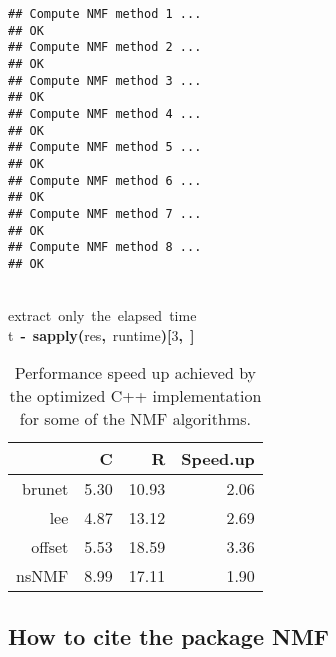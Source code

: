 \documentclass[a4paper]{article}\usepackage{graphicx, color}
\makeatletter
\newcommand{\hlnumber}[1]{\textcolor[rgb]{0,0,0}{#1}}%
\newcommand{\hlfunctioncall}[1]{\textcolor[rgb]{0.501960784313725,0,0.329411764705882}{\textbf{#1}}}%
\newcommand{\hlkeyword}[1]{\textcolor[rgb]{0,0,0}{\textbf{#1}}}%
\newcommand{\hlcomment}[1]{\textcolor[rgb]{0.180392156862745,0.6,0.341176470588235}{#1}}%
\newcommand{\hlassignement}[1]{\textcolor[rgb]{0,0,0}{\textbf{#1}}}%
\newcommand{\hlsymbol}[1]{\textcolor[rgb]{0,0,0}{#1}}%
\newcommand{\hlstd}[1]{\textcolor[rgb]{0,0,0}{#1}}%
\newenvironment{kframe}{%
 \def\FrameCommand##1{\hskip\@totalleftmargin \hskip-\fboxsep
 \colorbox{shadecolor}{##1}\hskip-\fboxsep
     \hskip-\linewidth \hskip-\@totalleftmargin \hskip\columnwidth}%
 \MakeFramed {\advance\hsize-\width
   \@totalleftmargin\z@ \linewidth\hsize
   \@setminipage}}%
 {\par\unskip\endMakeFramed}
\newenvironment{knitrout}{}{} %
\makeatother
\begin{document}
\begin{knitrout}
\begin{kframe}
\begin{flushleft}
\normalfont
\end{flushleft}
\begin{verbatim}
## Compute NMF method 1 ...
## OK
## Compute NMF method 2 ...
## OK
## Compute NMF method 3 ...
## OK
## Compute NMF method 4 ...
## OK
## Compute NMF method 5 ...
## OK
## Compute NMF method 6 ...
## OK
## Compute NMF method 7 ...
## OK
## Compute NMF method 8 ...
## OK
\end{verbatim}
\begin{flushleft}
\ttfamily\noindent
\hspace*{\fill}\\
\hlstd{}\hlcomment{\usebox{\hlnormalsizeboxhash}{\ }extract{\ }only{\ }the{\ }elapsed{\ }time}\hspace*{\fill}\\
\hlstd{}\hlsymbol{t}{\ }\hlassignement{\usebox{\hlnormalsizeboxlessthan}-}{\ }\hlfunctioncall{sapply}\hlkeyword{(}\hlsymbol{res}\hlkeyword{,}{\ }\hlsymbol{runtime}\hlkeyword{)}\hlkeyword{[}\hlnumber{3}\hlkeyword{,}{\ }\hlkeyword{]}\mbox{}
\normalfont
\end{flushleft}
\end{kframe}
\end{knitrout}



\begin{table}[ht]
\begin{center}
\begin{tabular}{rrrr}
  \hline
 & C & R & Speed.up \\ 
  \hline
brunet & 5.30 & 10.93 & 2.06 \\ 
  lee & 4.87 & 13.12 & 2.69 \\ 
  offset & 5.53 & 18.59 & 3.36 \\ 
  nsNMF & 8.99 & 17.11 & 1.90 \\ 
   \hline
\end{tabular}
\caption{Performance speed up achieved by the optimized C++ implementation for some of the NMF algorithms.}
\label{tab:perf}
\end{center}
\end{table}





\subsection{How to cite the package NMF}
\end{document}
